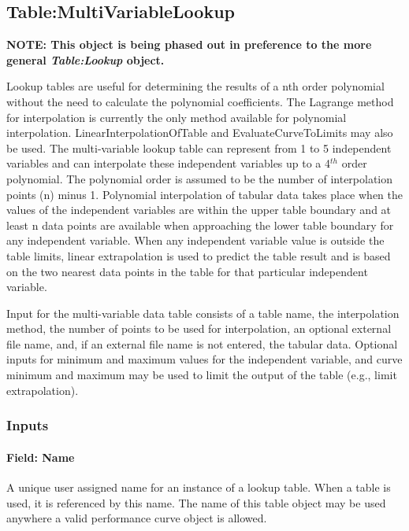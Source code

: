 \subsection{Table:MultiVariableLookup}\label{tablemultivariablelookup}

\textbf{NOTE: This object is being phased out in preference to the more general \emph{Table:Lookup} object.}

Lookup tables are useful for determining the results of a nth order polynomial without the need to calculate the polynomial coefficients. The Lagrange method for interpolation is currently the only method available for polynomial interpolation. LinearInterpolationOfTable and EvaluateCurveToLimits may also be used. The multi-variable lookup table can represent from 1 to 5 independent variables and can interpolate these independent variables up to a 4\(^{th}\) order polynomial. The polynomial order is assumed to be the number of interpolation points (n) minus 1. Polynomial interpolation of tabular data takes place when the values of the independent variables are within the upper table boundary and at least n data points are available when approaching the lower table boundary for any independent variable. When any independent variable value is outside the table limits, linear extrapolation is used to predict the table result and is based on the two nearest data points in the table for that particular independent variable.

Input for the multi-variable data table consists of a table name, the interpolation method, the number of points to be used for interpolation, an optional external file name, and, if an external file name is not entered, the tabular data. Optional inputs for minimum and maximum values for the independent variable, and curve minimum and maximum may be used to limit the output of the table (e.g., limit extrapolation).

\subsubsection{Inputs}\label{inputs-2-027}

\paragraph{Field: Name}\label{field-name-2-026}

A unique user assigned name for an instance of a lookup table. When a table is used, it is referenced by this name. The name of this table object may be used anywhere a valid performance curve object is allowed.

